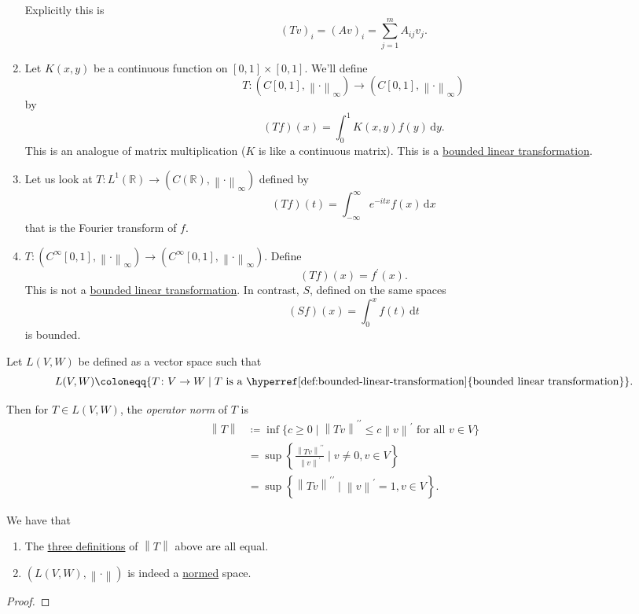 \begin{eg}
\begin{enumerate}
		      Explicitly this is
		      \[
			      (Tv)_i = (Av)_i = \sum_{j=1}^m A_{ij}v_j.
		      \]
		\item Let \(K(x,y)\) be a continuous function on \([0,1] \times [0,1]\). We'll define
		      \[
			      T \colon (C[0,1],\left\lVert \cdot\right\rVert _\infty) \to (C[0,1], \left\lVert \cdot\right\rVert _\infty)
		      \]
		      by
		      \[
			      (Tf)(x) = \int_0^1 K(x,y)f(y) \,\mathrm{d} y.
		      \]
		      This is an analogue of matrix multiplication ($K$ is like a continuous matrix). This is a \hyperref[def:bounded-linear-transformation]{bounded linear transformation}.
		\item Let us look at \(T \colon L^1(\mathbb{R}) \to (C(\mathbb{R}),\left\lVert \cdot\right\rVert _\infty)\) defined by
		      \[
			      (Tf)(t) = \int_{-\infty}^\infty e^{-itx}f(x) \,\mathrm{d} x
		      \]
		      that is the Fourier transform of \(f\).
		\item $T : (C^\infty[0,1],\left\lVert \cdot\right\rVert _\infty) \to (C^\infty[0,1], \left\lVert \cdot\right\rVert _\infty)$. Define
		      \[
			      (Tf)(x) = f^\prime (x).
		      \]
		      This is not a \hyperref[def:bounded-linear-transformation]{bounded linear transformation}. In contrast, \(S\), defined on the same spaces
		      \[
			      (Sf)(x) = \int_0^x f(t) \,\mathrm{d} t
		      \]
		      is bounded.
	\end{enumerate}
\end{eg}

\begin{definition}\label{def:operator-norm}
	Let \(L(V, W)\) be defined as a vector space such that
	\[
		L(V,W) \coloneqq \{T \colon V \to W \mid T \text{ is a \hyperref[def:bounded-linear-transformation]{bounded linear transformation}}\}.
	\]

	Then for \(T \in L(V,W)\), the \emph{operator norm} of \(T\) is
	\[
		\begin{split}
			\left\lVert T\right\rVert & \coloneqq \inf\{c \geq 0 \mid \left\lVert Tv\right\rVert^{\prime\prime}  \leq c\left\lVert v\right\rVert^\prime  \text{ for all } v \in V\} \\
			& = \sup\left\{ \frac{\left\lVert Tv\right\rVert^{\prime\prime}}{\left\lVert v\right\rVert^\prime } \mid v \neq 0, v \in V\right\}           \\
			& = \sup\left\{ \left\lVert Tv\right\rVert^{\prime\prime} \mid \left\lVert v\right\rVert^\prime  = 1, v \in V\right\}.
		\end{split}
	\]
\end{definition}

\begin{lemma}
	We have that
	\begin{enumerate}
		\item The \hyperref[def:operator-norm]{three definitions} of \(\left\lVert T\right\rVert\) above are all equal.
		\item \((L(V,W), \left\lVert \cdot\right\rVert )\) is indeed a \hyperref[def:norm]{normed} space.
	\end{enumerate}
\end{lemma}
\begin{proof}
\end{proof}